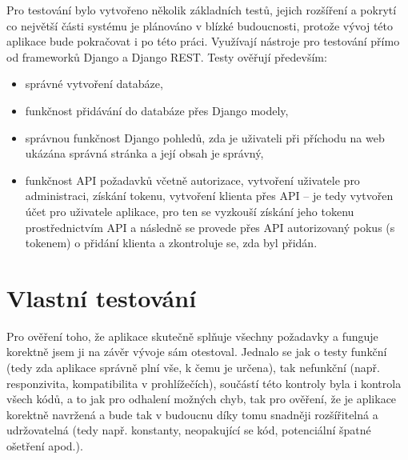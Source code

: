     Pro testování bylo vytvořeno několik základních testů, jejich rozšíření a pokrytí co největší části systému je plánováno v blízké budoucnosti, protože vývoj této aplikace bude pokračovat i po této práci. Využívají nástroje pro testování přímo od frameworků Django a Django REST. Testy ověřují především:
        \begin{itemize}
            \item správné vytvoření databáze,
            \item funkčnost přidávání do databáze přes Django modely,
            \item správnou funkčnost Django pohledů, zda je uživateli při příchodu na web ukázána správná stránka a její obsah je správný,
            \item funkčnost API požadavků včetně autorizace, vytvoření uživatele pro administraci, získání tokenu, vytvoření klienta přes API -- je tedy vytvořen účet pro uživatele aplikace, pro ten se vyzkouší získání jeho tokenu prostřednictvím API a následně se provede přes API autorizovaný pokus (s tokenem) o přidání klienta a zkontroluje se, zda byl přidán.
        \end{itemize}

    \section{Vlastní testování}
    Pro ověření toho, že aplikace skutečně splňuje všechny požadavky a funguje korektně jsem ji na závěr vývoje sám otestoval. Jednalo se jak o testy funkční (tedy zda aplikace správně plní vše, k čemu je určena), tak nefunkční (např. responzivita, kompatibilita v prohlížečích), součástí této kontroly byla i kontrola všech kódů, a to jak pro odhalení možných chyb, tak pro ověření, že je aplikace korektně navržená a bude tak v budoucnu díky tomu snadněji rozšířitelná a udržovatelná (tedy např. konstanty, neopakující se kód, potenciální špatné ošetření apod.).
    
